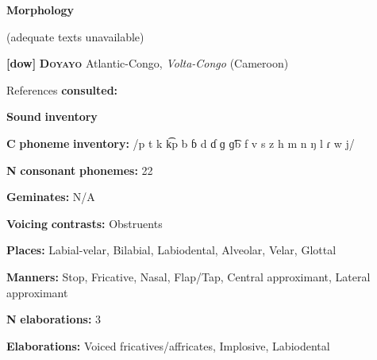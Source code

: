 \begin{styleBody}
\textbf{Morphology}
\end{styleBody}

\begin{styleBody}
(adequate texts unavailable)
\end{styleBody}

\begin{styleBody}
\textbf{[dow]}   \textbf{\textsc{Doyayo}}    Atlantic-Congo, \textit{Volta-Congo} (Cameroon)
\end{styleBody}

\begin{styleBody}
References \textbf{consulted:} \citet{WieringWiering1994}
\end{styleBody}

\begin{styleBody}
\textbf{Sound} \textbf{inventory}
\end{styleBody}

\begin{styleBody}
\textbf{C} \textbf{phoneme} \textbf{inventory:} /p t k k͡p b ɓ d ɗ ɡ ɡ͡b f v s z h m n ŋ l ɾ w j/
\end{styleBody}

\begin{styleBody}
\textbf{N} \textbf{consonant} \textbf{phonemes:} 22
\end{styleBody}

\begin{styleBody}
\textbf{Geminates:} N/A
\end{styleBody}

\begin{styleBody}
\textbf{Voicing} \textbf{contrasts:} Obstruents
\end{styleBody}

\begin{styleBody}
\textbf{Places:} Labial-velar, Bilabial, Labiodental, Alveolar, Velar, Glottal
\end{styleBody}

\begin{styleBody}
\textbf{Manners:} Stop, Fricative, Nasal, Flap/Tap, Central approximant, Lateral approximant
\end{styleBody}

\begin{styleBody}
\textbf{N} \textbf{elaborations:} 3
\end{styleBody}

\begin{styleBody}
\textbf{Elaborations:} Voiced fricatives/affricates, Implosive, Labiodental
\end{styleBody}

